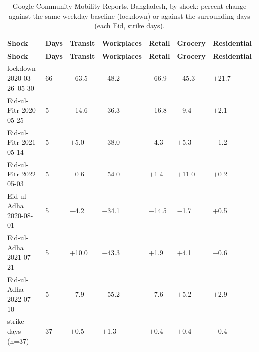 \begingroup\small
\begin{longtable}{L{4.4cm} C{1.0cm} C{1.8cm} C{1.8cm} C{1.8cm} C{1.8cm} C{1.8cm}}
\caption{Google Community Mobility Reports, Bangladesh, by shock: percent change against the same-weekday baseline (lockdown) or against the surrounding days (each Eid, strike days).}\label{tab:s-mobility}\\
\toprule
\textbf{Shock} & \textbf{Days} & \textbf{Transit} & \textbf{Workplaces} & \textbf{Retail} & \textbf{Grocery} & \textbf{Residential} \\
\midrule\endfirsthead
\toprule
\textbf{Shock} & \textbf{Days} & \textbf{Transit} & \textbf{Workplaces} & \textbf{Retail} & \textbf{Grocery} & \textbf{Residential} \\
\midrule\endhead
\bottomrule\endfoot
lockdown 2020-03-26--05-30 & 66 & $-$63.5 & $-$48.2 & $-$66.9 & $-$45.3 & $+$21.7 \\
Eid-ul-Fitr 2020-05-25 & 5 & $-$14.6 & $-$36.3 & $-$16.8 & $-$9.4 & $+$2.1 \\
Eid-ul-Fitr 2021-05-14 & 5 & $+$5.0 & $-$38.0 & $-$4.3 & $+$5.3 & $-$1.2 \\
Eid-ul-Fitr 2022-05-03 & 5 & $-$0.6 & $-$54.0 & $+$1.4 & $+$11.0 & $+$0.2 \\
Eid-ul-Adha 2020-08-01 & 5 & $-$4.2 & $-$34.1 & $-$14.5 & $-$1.7 & $+$0.5 \\
Eid-ul-Adha 2021-07-21 & 5 & $+$10.0 & $-$43.3 & $+$1.9 & $+$4.1 & $-$0.6 \\
Eid-ul-Adha 2022-07-10 & 5 & $-$7.9 & $-$55.2 & $-$7.6 & $+$5.2 & $+$2.9 \\
strike days (n=37) & 37 & $+$0.5 & $+$1.3 & $+$0.4 & $+$0.4 & $-$0.4 \\
\end{longtable}
\endgroup
